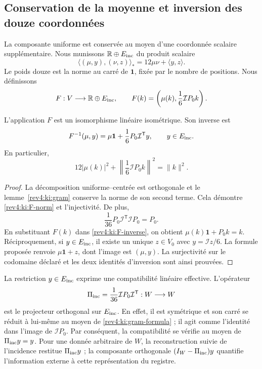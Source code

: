 \subsection{Conservation de la moyenne et inversion des douze coordonnées}
\label{rev4:ki:full-subsection}

La composante uniforme est conservée au moyen d’une coordonnée scalaire
supplémentaire. Nous munissons \(\mathbb R\oplus E_{\rm inc}\) du produit
scalaire
\[
 \langle(\mu,y),(\nu,z)\rangle_*=
 12\mu\nu+\langle y,z\rangle.
\]
Le poids douze est la norme au carré de \(\mathbf1\), fixée par le
nombre de positions. Nous définissons
\begin{equation}
 F:V\longrightarrow\mathbb R\oplus E_{\rm inc},\qquad
 F(k)=\left(\mu(k),\frac16\mathcal I P_0k\right).
 \label{rev4:ki:F}
\end{equation}

\begin{theorem}
\label{rev4:ki:full-isometry}
L'application \(F\) est un isomorphisme linéaire isométrique. Son inverse est
\begin{equation}
 F^{-1}(\mu,y)=\mu\mathbf1+
                  \frac16P_0\mathcal I^{\mathsf T}y,
 \qquad y\in E_{\rm inc}.
 \label{rev4:ki:F-inverse}
\end{equation}
En particulier,
\begin{equation}
 12|\mu(k)|^2+
 \left\|\frac16\mathcal I P_0k\right\|^2=\|k\|^2.
 \label{rev4:ki:F-norm}
\end{equation}
\end{theorem}
\begin{proof}
La décomposition uniforme--centrée est orthogonale et le
lemme~\ref{rev4:ki:gram} conserve la norme de son second terme.
Cela démontre \eqref{rev4:ki:F-norm} et l’injectivité.
De plus,
\[
 \frac1{36}P_0\mathcal I^{\mathsf T}\mathcal I P_0=P_0.
\]
En substituant \(F(k)\) dans \eqref{rev4:ki:F-inverse}, on obtient \(\mu(k)\mathbf1+P_0k=k\). Réciproquement, si \(y\in E_{\rm inc}\), il existe un unique \(z\in V_0\) avec \(y=\mathcal I z/6\). La formule proposée renvoie \(\mu\mathbf1+z\), dont l'image est \((\mu,y)\). La surjectivité sur le codomaine déclaré et les deux identités d'inversion sont ainsi prouvées.
\end{proof}

La restriction \(y\in E_{\rm inc}\) exprime une compatibilité
linéaire effective. L’opérateur
\begin{equation}
 \Pi_{\rm inc}=\frac1{36}\mathcal I P_0
                         \mathcal I^{\mathsf T}:W\longrightarrow W
 \label{rev4:ki:inc-projector}
\end{equation}
est le projecteur orthogonal sur \(E_{\rm inc}\). En effet, il est
symétrique et son carré se réduit à lui-même au moyen de
\eqref{rev4:ki:gram-formula} ; il agit comme l’identité dans l’image
de \(\mathcal I P_0\). Par conséquent, la compatibilité se vérifie
au moyen de \(\Pi_{\rm inc}y=y\). Pour une donnée arbitraire de
\(W\), la reconstruction suivie de l’incidence restitue
\(\Pi_{\rm inc}y\) ; la composante orthogonale
\((I_W-\Pi_{\rm inc})y\) quantifie l’information externe à
cette représentation du registre.

